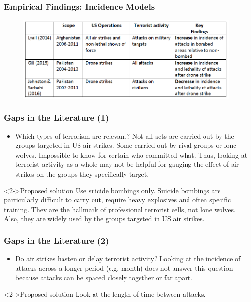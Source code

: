 \documentclass{beamer}
\begin{document}
  \begin{frame}
    \frametitle{Empirical Findings: Incidence Models}
	\begin{figure}[h!]
		\includegraphics[width=\linewidth]{incidence_models.PNG}
	\end{figure}
  \end{frame}

 \begin{frame}
    \frametitle{Gaps in the Literature (1)}
	\begin{itemize}
		\item Which types of terrorism are relevant? Not all acts are carried out by the groups targeted in US air strikes. Some carried out by rival groups or lone wolves. Impossible to know for certain who committed what. Thus, looking at terrorist activity as a whole may not be helpful for gauging the effect of air strikes on the groups they specifically target.
	\end{itemize}
\vspace{3mm}
    \begin{alertblock}<2->{Proposed solution}
      Use suicide bombings only. Suicide bombings are particularly difficult to carry out, require heavy explosives and often specific training. They are the hallmark of professional terrorist cells, not lone wolves. Also, they are widely used by the groups targeted in US air strikes.
    \end{alertblock}
  \end{frame}

 \begin{frame}
    \frametitle{Gaps in the Literature (2)}
	\begin{itemize}
		\item Do air strikes hasten or delay terrorist activity? Looking at the incidence of attacks across a longer period (e.g. month) does not answer this question because attacks can be spaced closely together or far apart.
	\end{itemize}
\vspace{3mm}
    \begin{alertblock}<2->{Proposed solution}
      Look at the length of time between attacks.
    \end{alertblock}
  \end{frame}
\end{document}
